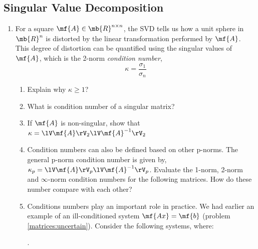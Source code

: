 
\subsection*{Singular Value Decomposition}
\begin{enumerate}[resume]
    \item For a square $\mf{A} \in\mb{R}^{n \times n}$, the SVD tells us how a unit sphere in $\mb{R}^n$ is distorted by the linear transformation performed by $\mf{A}$. This degree of distortion can be quantified using the singular values of $\mf{A}$, which is the 2-norm \textit{condition number},
    \[ \kappa = \frac{\sigma_1}{\sigma_n} \]
    \begin{enumerate}
        \item Explain why $\kappa \geq 1$?
        \item What is condition number of a singular matrix?
        \item If $\mf{A}$ is non-singular, show that $\kappa = \lV\mf{A}\rV_2\lV\mf{A}^{-1}\rV_2$
        \item Condition numbers can also be defined based on other p-norms. The general p-norm condition number is given by, $\kappa_p = \lV\mf{A}\rV_p\lV\mf{A}^{-1}\rV_p$. Evaluate the 1-norm, 2-norm and $\infty$-norm condition numbers for the following matrices. How do these number compare with each other?
        \item Conditions numbers play an important role in practice. We had earlier an example of an ill-conditioned system $\mf{Ax} = \mf{b}$ (problem \ref{matrices:uncertain}). Consider the following systems, where:
        .


\end{enumerate}
\end{enumerate}
